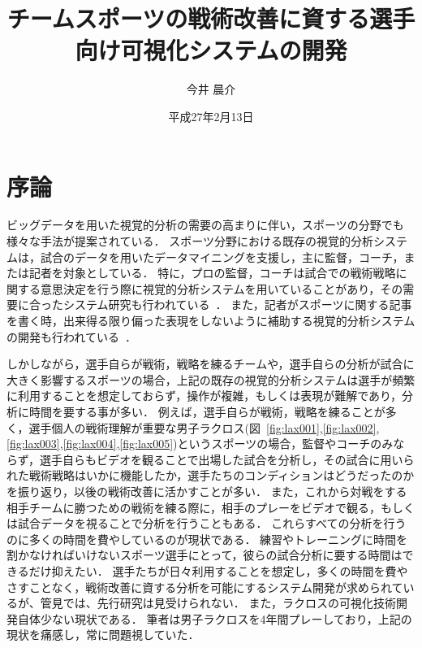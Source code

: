 \documentclass[sotsuron]{kuee}
\title{チームスポーツの戦術改善に資する選手向け可視化システムの開発}
\author{今井 晨介}
\date{平成27年2月13日}
\begin{document}
\maketitle
\tableofcontents


\chapter{序論}
	ビッグデータを用いた視覚的分析の需要の高まりに伴い，スポーツの分野でも様々な手法が提案されている．
	スポーツ分野における既存の視覚的分析システムは，試合のデータを用いたデータマイニングを支援し，主に監督，コーチ，または記者を対象としている．
	特に，プロの監督，コーチは試合での戦術戦略に関する意思決定を行う際に視覚的分析システムを用いていることがあり，その需要に合ったシステム研究も行われている~\cite{SoccerStory,SnapShot,TenniVis}．
	また，記者がスポーツに関する記事を書く時，出来得る限り偏った表現をしないように補助する視覚的分析システムの開発も行われている~\cite{SoccerStory}．
	
	しかしながら，選手自らが戦術，戦略を練るチームや，選手自らの分析が試合に大きく影響するスポーツの場合，上記の既存の視覚的分析システムは選手が頻繁に利用することを想定しておらず，操作が複雑，もしくは表現が難解であり，分析に時間を要する事が多い．
	例えば，選手自らが戦術，戦略を練ることが多く，選手個人の戦術理解が重要な男子ラクロス(図~\ref{fig:lax001},\ref{fig:lax002},\ref{fig:lax003},\ref{fig:lax004},\ref{fig:lax005})というスポーツの場合，監督やコーチのみならず，選手自らもビデオを観ることで出場した試合を分析し，その試合に用いられた戦術戦略はいかに機能したか，選手たちのコンディションはどうだったのかを振り返り，以後の戦術改善に活かすことが多い．
	また，これから対戦をする相手チームに勝つための戦術を練る際に，相手のプレーをビデオで観る，もしくは試合データを視ることで分析を行うこともある．
	これらすべての分析を行うのに多くの時間を費やしているのが現状である．
	練習やトレーニングに時間を割かなければいけないスポーツ選手にとって，彼らの試合分析に要する時間はできるだけ抑えたい．
	選手たちが日々利用することを想定し，多くの時間を費やさすことなく，戦術改善に資する分析を可能にするシステム開発が求められているが、管見では、先行研究は見受けられない．
	また，ラクロスの可視化技術開発自体少ない現状である．
	筆者は男子ラクロスを4年間プレーしており，上記の現状を痛感し，常に問題視していた．
	
\end{document}
